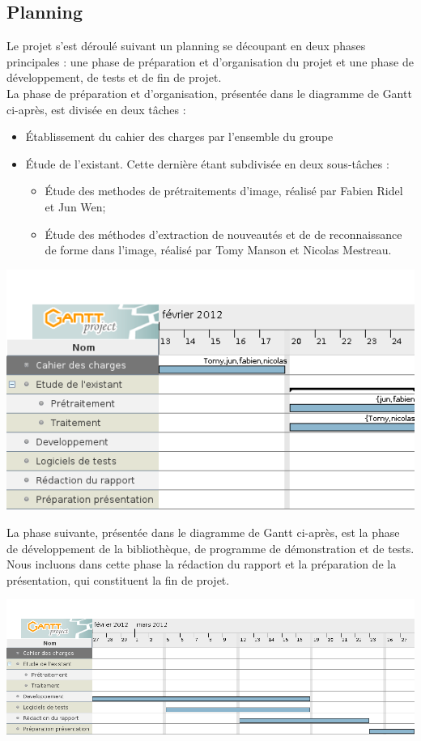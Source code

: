 
\clearpage
\subsection{Planning}
Le projet s'est déroulé suivant un planning se découpant en deux phases principales : une phase de préparation et d'organisation du projet et une phase de développement, de tests et de fin de projet.\\

La phase de préparation et d'organisation, présentée dans le diagramme de Gantt ci-après, est divisée en deux tâches :
 \begin{itemize}
 \item \'Etablissement du cahier des charges par l'ensemble du groupe
 \item \'Etude de l'existant. Cette dernière étant subdivisée en deux sous-tâches : 
	 \begin{itemize}
		\item \'Etude des methodes de prétraitements d'image, réalisé par Fabien Ridel et Jun Wen;
		\item \'Etude des méthodes d'extraction de nouveautés et de de reconnaissance de forme dans l'image, réalisé par Tomy Manson et Nicolas Mestreau.
	\end{itemize}
\end{itemize} 

\begin{center}
\includegraphics[width=\textwidth]{gantt1.png}
\end{center}

\clearpage
La phase suivante, présentée dans le diagramme de Gantt ci-après, est la phase de développement de la bibliothèque, de programme de démonstration et de tests. Nous incluons dans cette phase la rédaction du rapport et la préparation de la présentation, qui constituent la fin de projet.

\begin{center}
\includegraphics[width=\textwidth]{gantt2.png}
\end{center}